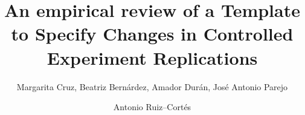 \documentclass[runningheads]{llncs}
\begin{document}
\sloppy %
%
%

\newcommand{\gls}[1]{#1\xspace}

\vspace{1cm}


\title{An empirical review of a Template to Specify Changes in Controlled Experiment Replications}


\author{Margarita Cruz,         Beatriz Bernárdez,         Amador Durán, José Antonio Parejo \and  Antonio Ruiz–Cortés}
%

\institute{Dept. Lenguajes y Sistemas Informáticos, University of Seville, Seville, Spain.\\
 \email{ \{cruz,beat,amador,japarejo,aruiz\}@us.es}   }      

\maketitle              %
\end{document}
